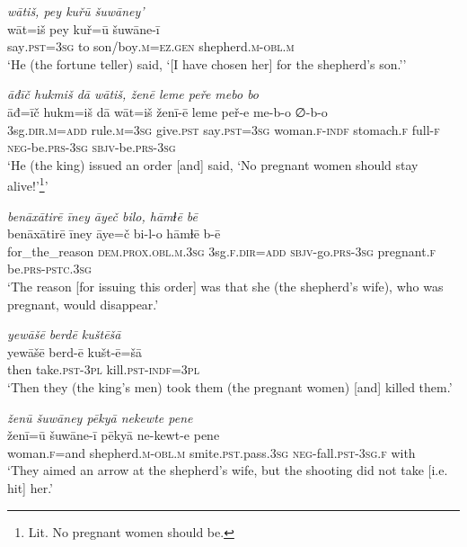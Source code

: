 \ea \label{KŠ.16}
\textit{wātiš, pey kuřū šuwāney’} \\ 
\gll wāt=iš pey kuř=ū šuwāne-ī \\ 
 say\textsc{.pst}\textsc{=3sg} to son/boy\textsc{.m}\textsc{=ez.gen} shepherd\textsc{.m}\textsc{-obl}\textsc{.m} \\ 
\glt `He (the fortune teller) said, ‘[I have chosen her] for the shepherd’s son.’'
\z 
 
\ea \label{KŠ.17}
\textit{āđīč hukmiš dā wātiš, ženē leme peře mebo bo} \\ 
\gll āđ=īč hukm=iš dā wāt=iš ženī-ē leme peř-e me-b-o ∅-b-o \\ 
 3sg\textsc{.dir}\textsc{.m}\textsc{=add} rule\textsc{.m}\textsc{=3sg} give\textsc{.pst} say\textsc{.pst}\textsc{=3sg} woman\textsc{.f}\textsc{-indf} stomach\textsc{.f} full\textsc{-f} \textsc{neg-}be\textsc{.prs}\textsc{-3sg} \textsc{sbjv-}be\textsc{.prs}\textsc{-3sg} \\ 
\glt `He (the king) issued an order [and] said, ‘No pregnant women should stay alive!’\footnote{Lit. No pregnant women should be.}'
\z 
 
\ea \label{KŠ.18}
\textit{benāxātirē īney āyeč bilo, hāmɫē bē} \\ 
\gll benāxātirē īney āye=č bi-l-o hāmɫē b-ē \\ 
 for\_the\_reason \textsc{dem.prox}\textsc{.obl}\textsc{.m}\textsc{.3sg} 3sg\textsc{.f}\textsc{.dir}\textsc{=add} \textsc{sbjv-}go\textsc{.prs}\textsc{-3sg} pregnant\textsc{.f} be\textsc{.prs}\textsc{-pstc}\textsc{.3sg} \\ 
\glt `The reason [for issuing this order] was that she (the shepherd’s wife), who was pregnant, would disappear.'
\z 
 
\ea \label{KŠ.19}
\textit{yewāšē berdē kuštēšā} \\ 
\gll yewāšē berd-ē kušt-ē=šā \\ 
 then take\textsc{.pst}\textsc{-3pl} kill\textsc{.pst}\textsc{-indf}\textsc{=3pl} \\ 
\glt `Then they (the king’s men) took them (the pregnant women) [and] killed them.'
\z 
 
\ea \label{KŠ.20}
\textit{ženū šuwāney pēkyā nekewte pene} \\ 
\gll ženī=ū šuwāne-ī pēkyā ne-kewt-e pene \\ 
 woman\textsc{.f}=and shepherd\textsc{.m}\textsc{-obl}\textsc{.m} smite\textsc{.pst}.pass\textsc{.3sg} \textsc{neg-}fall\textsc{.pst}\textsc{-3sg}\textsc{.f} with \\ 
\glt `They aimed an arrow at the shepherd’s wife, but the shooting did not take [i.e. hit] her.'
\z 
 
